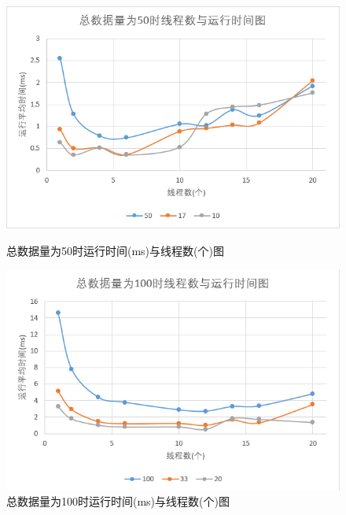 \documentclass[UTF8]{ctexart}
\begin{document}
\begin{figure}[H]
    \centering
    \begin{minipage}[t]{0.45\linewidth}
    \centering
    \includegraphics[scale=0.33]{50.png}
    \caption{总数据量为50时运行时间(ms)与线程数(个)图}
    \end{minipage}%
    \begin{minipage}[t]{0.45\linewidth}
    \centering
    \includegraphics[scale=0.33]{100.png}
    \caption{总数据量为100时运行时间(ms)与线程数(个)图}
    \end{minipage}
\end{figure}
\end{document}
